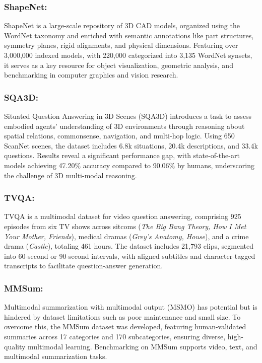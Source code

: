 \documentclass[runningheads]{llncs}
\begin{document}
\subsubsection{ShapeNet:}
ShapeNet \cite{ref85} is a large-scale repository of 3D CAD models, organized using the WordNet taxonomy and enriched with semantic annotations like part structures, symmetry planes, rigid alignments, and physical dimensions. Featuring over 3,000,000 indexed models, with 220,000 categorized into 3,135 WordNet synsets, it serves as a key resource for object visualization, geometric analysis, and benchmarking in computer graphics and vision research.

\subsubsection{SQA3D:}
Situated Question Answering in 3D Scenes (SQA3D) \cite{ref97} introduces a task to assess embodied agents' understanding of 3D environments through reasoning about spatial relations, commonsense, navigation, and multi-hop logic. Using 650 ScanNet scenes, the dataset includes 6.8k situations, 20.4k descriptions, and 33.4k questions. Results reveal a significant performance gap, with state-of-the-art models achieving 47.20\% accuracy compared to 90.06\% by humans, underscoring the challenge of 3D multi-modal reasoning.

\subsubsection{TVQA:}
TVQA \cite{ref41} is a multimodal dataset for video question answering, comprising 925 episodes from six TV shows across sitcoms (\textit{The Big Bang Theory, How I Met Your Mother, Friends}), medical dramas (\textit{Grey’s Anatomy, House}), and a crime drama (\textit{Castle}), totaling 461 hours. The dataset includes 21,793 clips, segmented into 60-second or 90-second intervals, with aligned subtitles and character-tagged transcripts to facilitate question-answer generation.

\subsubsection{MMSum:}
Multimodal summarization with multimodal output (MSMO) has potential but is hindered by dataset limitations such as poor maintenance and small size. To overcome this, the MMSum dataset \cite{ref76} was developed, featuring human-validated summaries across 17 categories and 170 subcategories, ensuring diverse, high-quality multimodal learning. Benchmarking on MMSum supports video, text, and multimodal summarization tasks.
\end{document}
